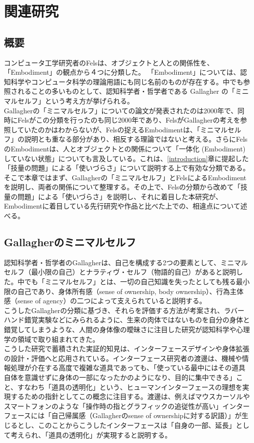 \chapter{関連研究}
\label{related_works}
\section{概要}
コンピュータ工学研究者のFelsは、オブジェクトと人との関係性を、「Embodiment」の観点から４つに分類した\cite{Fels}。
「Embodiment」については、認知科学やコンピュータ科学の理論用語にも同じ名前のものが存在する。中でも参照されることの多いものとして、認知科学者・哲学者である Gallagher\cite{Gallagher2000} の「ミニマルセルフ」という考え方が挙げられる。\\
Gallagherの「ミニマルセルフ」についての論文が発表されたのは2000年で、同時にFelsがこの分類を行ったのも同じ2000年であり、FelsがGallagherの考えを参照していたのかはわからないが、Felsの捉えるEmbodimentは、「ミニマルセルフ」の説明とも重なる部分があり、相反する理論ではないと考える。さらにFelsのEmbodimentは、人とオブジェクトとの関係について「一体化 (Embodiment) していない状態」についても言及している。これは、\ref{introduction}章に提起した「技量の問題」による「使いづらさ」について説明する上で有効な分類である。\\
そこで本章ではまず、Gallagherの「ミニマルセルフ」とFelsによるEmbodimentを説明し、両者の関係について整理する。その上で、Felsの分類から改めて「技量の問題」による「使いづらさ」を説明し、それに着目した本研究が、Embodimentに着目している先行研究や作品と比べた上での、相違点について述べる。

\section{Gallagherのミニマルセルフ}
認知科学者・哲学者のGallagher\cite{Gallagher2000}は、自己を構成する2つの要素として、ミニマルセルフ（最小限の自己）とナラティヴ・セルフ（物語的自己）があると説明した。中でも「ミニマルセルフ」とは、一切の自己知識を失ったとしても残る最小限の自己であり、身体所有感（sense of ownership, body ownership）、行為主体感（sense of agency）の二つによって支えられていると説明する。\\
こうしたGallagherの分類に基づき、それらを評価する方法が考案され、ラバーハンド錯覚実験などにみられるように、生来の肉体ではないものを自分の身体と錯覚してしまうような、人間の身体像の曖昧さに注目した研究が認知科学や心理学の領域で取り組まれてきた。\\
こうした研究で蓄積された実証的知見は、インターフェースデザインや身体拡張の設計・評価へと応用されている。インターフェース研究者の渡邊は、機械や情報処理が介在する高度で複雑な道具であっても、「使っている最中にはその道具自体を意識せずに身体の一部になったかのようになり、目的に集中できる」こと、すなわち「道具の透明化」という、ヒューマンインターフェースの理想を実現するための指針としてこの概念に注目する。渡邊は、例えばマウスカーソルやスマートフォンのような「操作時の指とグラフィックの追従性が高い」インターフェースには「自己帰属感（Gallagherのsense of ownershipに対する訳語）」が生じるとし、このことからこうしたインターフェースは「自身の一部、延長」として考えられ、「道具の透明化」が実現すると説明する\cite{Watanabe2013}\cite{Watanabe2017}。

